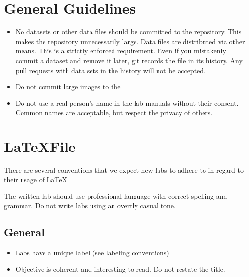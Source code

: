 \label{lab:template}

\section*{General Guidelines}
\begin{itemize}
\item No datasets or other data files should be committed to the repository.  This makes the repository unnecessarily large.  Data files are distributed via other means.  This is a strictly enforced requirement.  Even if you mistakenly commit a dataset and remove it later, git records the file in its history.  Any pull requests with data sets in the history will not be accepted.
\item Do not commit large images to the 
\item Do not use a real person's name in the lab manuals without their consent.  Common names are acceptable, but respect the privacy of others.
\end{itemize}


\section*{\LaTeX File}
There are several conventions that we expect new labs to adhere to in regard to their usage of \LaTeX.

The written lab should use professional language with correct spelling and grammar.
Do not write labs using an overtly casual tone.

\subsection{General}
\begin{itemize}
\item Labs have a unique label (see labeling conventions)
\item Objective is coherent and interesting to read. Do not restate the title.
\end{itemize}

